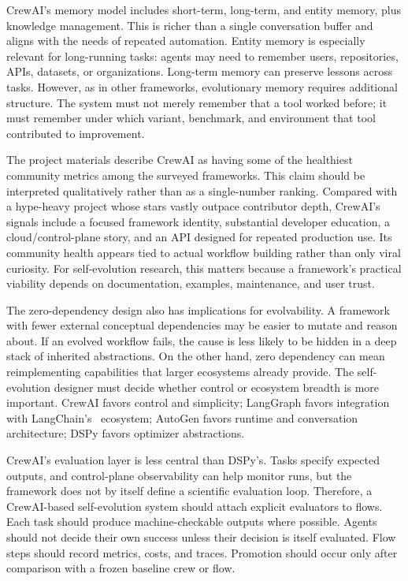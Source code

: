 CrewAI's memory model includes short-term, long-term, and entity memory, plus knowledge management.  This is richer than a single conversation buffer and aligns with the needs of repeated automation.  Entity memory is especially relevant for long-running tasks: agents may need to remember users, repositories, APIs, datasets, or organizations.  Long-term memory can preserve lessons across tasks.  However, as in other frameworks, evolutionary memory requires additional structure.  The system must not merely remember that a tool worked before; it must remember under which variant, benchmark, and environment that tool contributed to improvement.

The project materials describe CrewAI as having some of the healthiest community metrics among the surveyed frameworks.  This claim should be interpreted qualitatively rather than as a single-number ranking.  Compared with a hype-heavy project whose stars vastly outpace contributor depth, CrewAI's signals include a focused framework identity, substantial developer education, a cloud/control-plane story, and an API designed for repeated production use.  Its community health appears tied to actual workflow building rather than only viral curiosity.  For self-evolution research, this matters because a framework's practical viability depends on documentation, examples, maintenance, and user trust.

The zero-dependency design also has implications for evolvability.  A framework with fewer external conceptual dependencies may be easier to mutate and reason about.  If an evolved workflow fails, the cause is less likely to be hidden in a deep stack of inherited abstractions.  On the other hand, zero dependency can mean reimplementing capabilities that larger ecosystems already provide.  The self-evolution designer must decide whether control or ecosystem breadth is more important.  CrewAI favors control and simplicity; LangGraph favors integration with LangChain's~\cite{chase2023langchain} ecosystem; AutoGen favors runtime and conversation architecture; DSPy favors optimizer abstractions.

CrewAI's evaluation layer is less central than DSPy's.  Tasks specify expected outputs, and control-plane observability can help monitor runs, but the framework does not by itself define a scientific evaluation loop.  Therefore, a CrewAI-based self-evolution system should attach explicit evaluators to flows.  Each task should produce machine-checkable outputs where possible.  Agents should not decide their own success unless their decision is itself evaluated.  Flow steps should record metrics, costs, and traces.  Promotion should occur only after comparison with a frozen baseline crew or flow.

